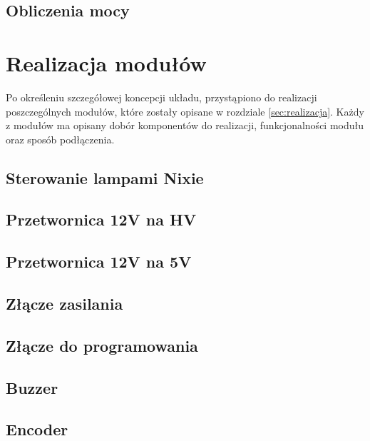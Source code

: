 \documentclass[twoside]{article}
\begin{document}
\subsection{Obliczenia mocy}

\newpage

\section{Realizacja modułów}
Po określeniu szczegółowej koncepcji układu, przystąpiono do realizacji poszczególnych modułów, które zostały opisane w rozdziale \ref{sec:realizacja}.
Każdy z modułów ma opisany dobór komponentów do realizacji, funkcjonalności modułu oraz sposób podłączenia.

\subsection{Sterowanie lampami Nixie}

\newpage

\subsection{Przetwornica 12V na HV}

\newpage

\subsection{Przetwornica 12V na 5V}

\newpage

\subsection{Złącze zasilania}

\newpage

\subsection{Złącze do programowania}
\label{sec:usb_c_to_program}

\newpage

\subsection{Buzzer}

\newpage

\subsection{Encoder}

\newpage
\end{document}
